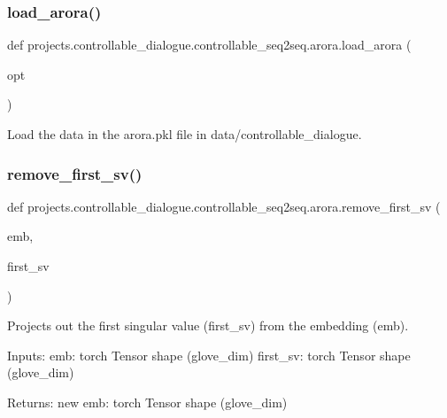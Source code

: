 \subsubsection{\texorpdfstring{load\+\_\+arora()}{load\_arora()}}
{\footnotesize\ttfamily def projects.\+controllable\+\_\+dialogue.\+controllable\+\_\+seq2seq.\+arora.\+load\+\_\+arora (\begin{DoxyParamCaption}\item[{}]{opt }\end{DoxyParamCaption})}

\begin{DoxyVerb}Load the data in the arora.pkl file in data/controllable_dialogue.
\end{DoxyVerb}
 \mbox{\label{namespaceprojects_1_1controllable__dialogue_1_1controllable__seq2seq_1_1arora_a09f85328842233be3deb489594521c6f}} 
\subsubsection{\texorpdfstring{remove\+\_\+first\+\_\+sv()}{remove\_first\_sv()}}
{\footnotesize\ttfamily def projects.\+controllable\+\_\+dialogue.\+controllable\+\_\+seq2seq.\+arora.\+remove\+\_\+first\+\_\+sv (\begin{DoxyParamCaption}\item[{}]{emb,  }\item[{}]{first\+\_\+sv }\end{DoxyParamCaption})}

\begin{DoxyVerb}Projects out the first singular value (first_sv) from the embedding (emb).

Inputs:
  emb: torch Tensor shape (glove_dim)
  first_sv: torch Tensor shape (glove_dim)

Returns:
  new emb: torch Tensor shape (glove_dim)
\end{DoxyVerb}
 

